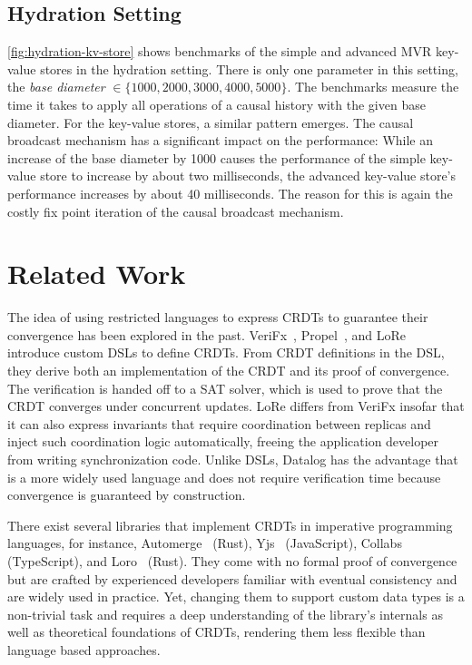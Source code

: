 \subsection{Hydration Setting}\label{sec:hydration-benchmark}



\ref{fig:hydration-kv-store} shows benchmarks of the simple and advanced
\ac{MVR} key-value stores in the hydration setting.
There is only one parameter in this setting,
the \emph{base diameter} \(\in \{1000, 2000, 3000, 4000, 5000\}\).
The benchmarks measure the time it takes to apply all operations of a
causal history with the given base diameter.
For the key-value stores, a similar pattern emerges.
The causal broadcast mechanism has a significant impact on the performance:
While an increase of the base diameter by 1000 causes the performance of the
simple key-value store to increase by about two milliseconds,
the advanced key-value store's performance increases by about 40 milliseconds.
The reason for this is again the costly fix point iteration of the causal
broadcast mechanism.

\section{Related Work}\label{sec:related-work}

The idea of using restricted languages to express \acp{CRDT} to guarantee
their convergence has been explored in the past.
VeriFx~\cite{verifx}, Propel~\cite{propel}, and LoRe~\cite{lore} introduce
custom \acp{DSL} to define \acp{CRDT}.
From \ac{CRDT} definitions in the \ac{DSL}, they derive both an implementation
of the \ac{CRDT} and its proof of convergence.
The verification is handed off to a \acs{SAT} solver, which is used to
prove that the \ac{CRDT} converges under concurrent updates.
LoRe differs from VeriFx insofar that it can also express invariants that
require coordination between replicas and inject such coordination logic
automatically, freeing the application developer from writing synchronization
code.
Unlike \acp{DSL}, Datalog has the advantage that is a more widely used language
and does not require verification time because convergence is guaranteed by
construction.

There exist several libraries that implement \acp{CRDT} in imperative programming
languages, for instance, Automerge~\cite{automerge} (Rust),
Yjs~\cite{yjs} (JavaScript), Collabs~\cite{collabs} (TypeScript),
and Loro~\cite{loro} (Rust).
They come with no formal proof of convergence but are crafted by experienced
developers familiar with eventual consistency and are widely used in practice.
Yet, changing them to support custom data types is a non-trivial task and
requires a deep understanding of the library's internals as well as theoretical
foundations of \acp{CRDT}, rendering them less flexible than language based
approaches.

